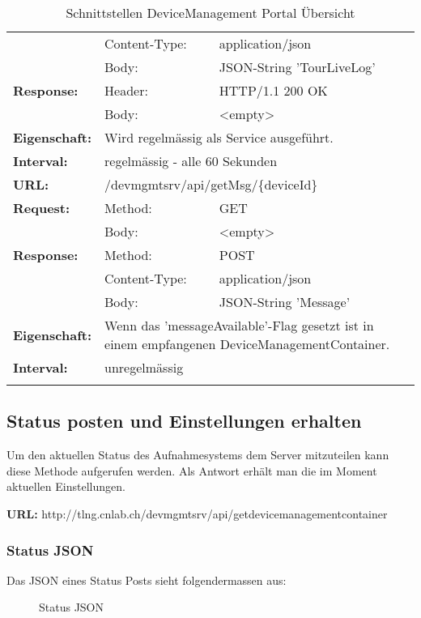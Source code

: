 {\begin{longtable}{ p{2.5cm} p{3.5cm} p{7cm}}
		& Content-Type: & application/json \\
		& Body: & JSON-String 'TourLiveLog' \\
	\textbf{Response:} &  Header: & HTTP/1.1 200 OK \\
		& Body: & <empty>	\\
	\textbf{Eigenschaft:} &  \multicolumn{2}{p{10cm}}{Wird regelmässig als Service ausgeführt.}\\ 
	\textbf{Interval:} &  \multicolumn{2}{p{10cm}}{regelmässig - alle 60 Sekunden}\\
\hline
\hline 
	\textbf{URL:} & \multicolumn{2}{p{10cm}}{/devmgmtsrv/api/getMsg/\{deviceId\}} \\
	\textbf{Request:} & Method: & GET \\
		& Body: & <empty> \\
	\textbf{Response:} & Method: & POST \\
		& Content-Type: & application/json \\
		& Body: & JSON-String 'Message' \\
	\textbf{Eigenschaft:} & \multicolumn{2}{p{10cm}}{ Wenn das 'messageAvailable'-Flag gesetzt ist in einem empfangenen DeviceManagementContainer.} \\
	\textbf{Interval:} & \multicolumn{2}{p{10cm}}{unregelmässig}\\
\hline
\hline 

\caption{Schnittstellen DeviceManagement Portal Übersicht}
\end{longtable} }

\pagebreak
\subsection{Status posten und Einstellungen erhalten}

Um den aktuellen Status des Aufnahmesystems dem Server mitzuteilen kann diese Methode aufgerufen werden. Als Antwort erhält man die im Moment aktuellen Einstellungen.

{\bf URL: }http://tlng.cnlab.ch/devmgmtsrv/api/getdevicemanagementcontainer 

\subsubsection{Status JSON}

Das JSON eines Status Posts sieht folgendermassen aus:

\begin{figure}[H]
	\centering
	
	\caption{Status JSON}
\end{figure}


